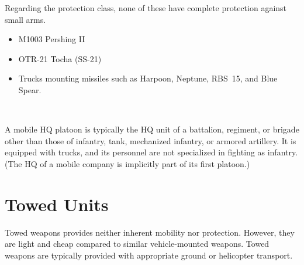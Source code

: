 \begin{withcounters}
{        Regarding the protection class, none of these have complete protection against small arms.
        \begin{itemize}
            \item M1003 Pershing II
            \item OTR-21 Tocha (SS-21)
            \item Trucks mounting missiles such as Harpoon, Neptune, RBS~15, and Blue Spear.
        \end{itemize}
    }\\


    A mobile HQ platoon is typically the HQ unit of a battalion, regiment, or brigade other than those of infantry, tank, mechanized infantry, or armored artillery.
    It is equipped with trucks, and its personnel are not specialized in fighting as infantry.
    (The HQ of a mobile company is implicitly part of its first platoon.)

\end{withcounters}

\section{Towed Units}

Towed weapons provides neither inherent mobility nor protection.
However, they are light and cheap compared to similar vehicle-mounted weapons.
Towed weapons are typically provided with appropriate ground or helicopter transport.


